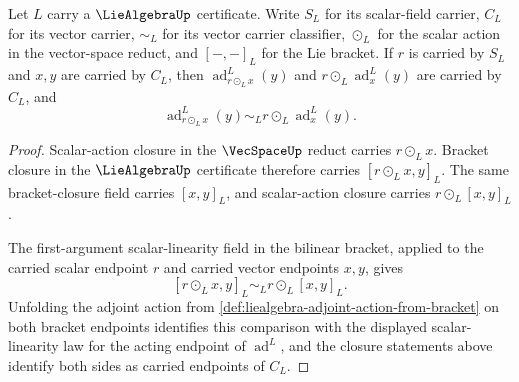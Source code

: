 \begin{theorem}
\label{thm:liealgebra-adjoint-action-acting-endpoint-scalar-linearity}
Let $L$ carry a $\LieAlgebraUp$ certificate. Write $S_L$ for its scalar-field carrier, $C_L$ for its vector carrier, $\sim_{L}$ for its vector carrier classifier, $\odot_L$ for the scalar action in the vector-space reduct, and $[-,-]_L$ for the Lie bracket. If $r$ is carried by $S_L$ and $x,y$ are carried by $C_L$, then $\operatorname{ad}^{L}_{r\odot_L x}(y)$ and $r\odot_L\operatorname{ad}^{L}_{x}(y)$ are carried by $C_L$, and
$$
\operatorname{ad}^{L}_{r\odot_L x}(y)
\sim_{L}
r\odot_L\operatorname{ad}^{L}_{x}(y).
$$
\end{theorem}
\begin{proof}
Scalar-action closure in the $\VecSpaceUp$ reduct carries $r\odot_L x$. Bracket closure in the $\LieAlgebraUp$ certificate therefore carries $[r\odot_L x,y]_L$. The same bracket-closure field carries $[x,y]_L$, and scalar-action closure carries $r\odot_L[x,y]_L$.

The first-argument scalar-linearity field in the bilinear bracket, applied to the carried scalar endpoint $r$ and carried vector endpoints $x,y$, gives
$$
[r\odot_L x,y]_L
\sim_{L}
r\odot_L[x,y]_L.
$$
Unfolding the adjoint action from \autoref{def:liealgebra-adjoint-action-from-bracket} on both bracket endpoints identifies this comparison with the displayed scalar-linearity law for the acting endpoint of $\operatorname{ad}^{L}$, and the closure statements above identify both sides as carried endpoints of $C_L$.
\end{proof}

